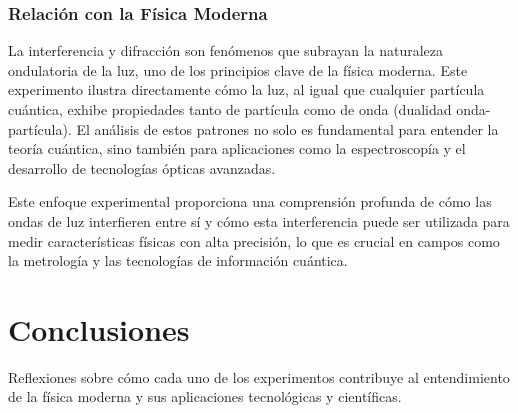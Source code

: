 \subsubsection{Relación con la Física Moderna}
La interferencia y difracción son fenómenos que subrayan la naturaleza ondulatoria de la luz, uno de los principios clave de la física moderna. Este experimento ilustra directamente cómo la luz, al igual que cualquier partícula cuántica, exhibe propiedades tanto de partícula como de onda (dualidad onda-partícula). El análisis de estos patrones no solo es fundamental para entender la teoría cuántica, sino también para aplicaciones como la espectroscopía y el desarrollo de tecnologías ópticas avanzadas.

Este enfoque experimental proporciona una comprensión profunda de cómo las ondas de luz interfieren entre sí y cómo esta interferencia puede ser utilizada para medir características físicas con alta precisión, lo que es crucial en campos como la metrología y las tecnologías de información cuántica.


\section{Conclusiones}
Reflexiones sobre cómo cada uno de los experimentos contribuye al entendimiento de la física moderna y sus aplicaciones tecnológicas y científicas.
